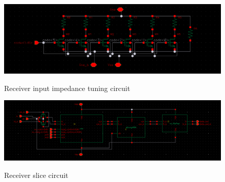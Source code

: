\begin{figure}[H]
  \centering
  {\includegraphics[scale=0.4]{schematics/rx_inp_impedance.png}}
  \caption{Receiver input impedance tuning circuit}
  \label{fig:imp_tuning}
\end{figure}

\begin{figure}[H]
  \centering
  {\includegraphics[scale=0.4]{schematics/receiver_slice.png}}
  \caption{Receiver slice circuit}
  \label{fig:receiver_slice}
\end{figure}



